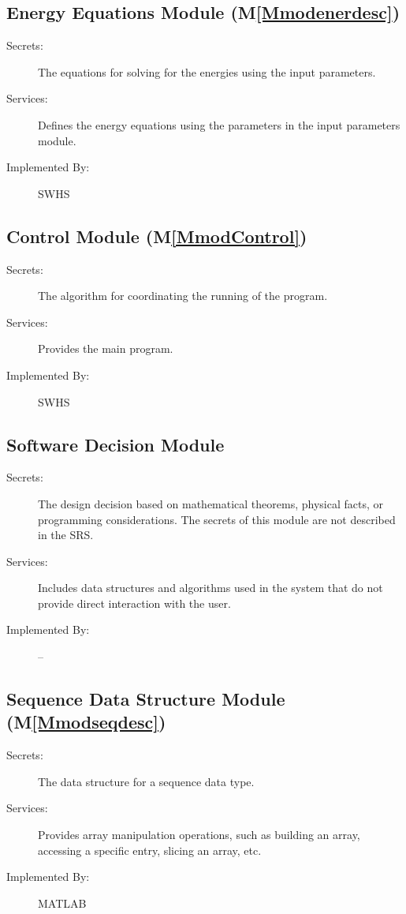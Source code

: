 \documentclass[12pt]{article}
\begin{document}
\subsection{Energy Equations Module (M\ref{Mmodenerdesc})}
\label{Sec:EnerEquaModu()}
\begin{description}
\item[Secrets:]The equations for solving for the energies using the input parameters.
\item[Services:]Defines the energy equations using the parameters in the input parameters module.
\item[Implemented By:]SWHS
\end{description}
\subsection{Control Module (M\ref{MmodControl})}
\label{Sec:CM()}
\begin{description}
\item[Secrets:]The algorithm for coordinating the running of the program.
\item[Services:]Provides the main program.
\item[Implemented By:]SWHS
\end{description}
\subsection{Software Decision Module}
\label{Sec:SoftDeciModu}
\begin{description}
\item[Secrets:]The design decision based on mathematical theorems, physical facts, or programming considerations. The secrets of this module are not described in the SRS.
\item[Services:]Includes data structures and algorithms used in the system that do not provide direct interaction with the user.
\item[Implemented By:]--
\end{description}
\subsection{Sequence Data Structure Module (M\ref{Mmodseqdesc})}
\label{Sec:SequDataStruModu()}
\begin{description}
\item[Secrets:]The data structure for a sequence data type.
\item[Services:]Provides array manipulation operations, such as building an array, accessing a specific entry, slicing an array, etc.
\item[Implemented By:]MATLAB
\end{description}
\end{document}
